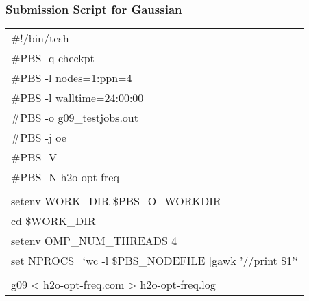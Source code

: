 \documentclass[slidestop,mathserif,compress,xcolor=svgnames]{beamer}
\newenvironment{eblock}[0]
{
\begin{beamerboxesrounded}[upper=uppercol2,lower=lowercol2,shadow=true]}
{\end{beamerboxesrounded}}
\begin{document}
\begin{frame}
  \frametitle{\small Submission Script for Gaussian}
  \begin{eblock}{}
    \begin{tabular}{l}
      \#!/bin/tcsh\\
      \#PBS -q checkpt \\
      \#PBS -l nodes=1:ppn=4\\
      \#PBS -l walltime=24:00:00\\
      \#PBS -o g09\_testjobs.out\\
      \#PBS -j oe\\
      \#PBS -V \\
      \#PBS -N h2o-opt-freq\\
      \\
      setenv WORK\_DIR \$PBS\_O\_WORKDIR\\
      cd \$WORK\_DIR\\
      setenv OMP\_NUM\_THREADS 4\\
      set NPROCS=`wc -l \$PBS\_NODEFILE |gawk '//{print \$1}'`\\
      \\
      g09 < h2o-opt-freq.com > h2o-opt-freq.log
      \\
    \end{tabular}
  \end{eblock}
\end{frame}
\end{document}
